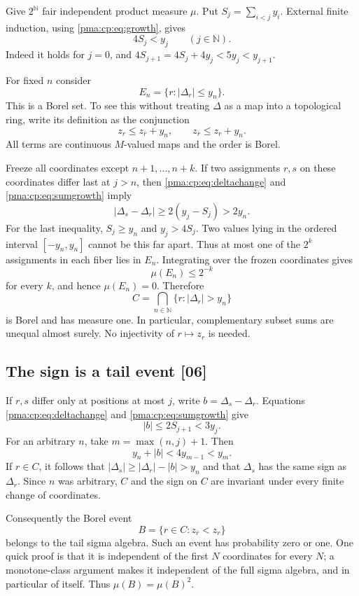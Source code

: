\documentclass[11pt]{article}
\numberwithin{equation}{section}
\theoremstyle{definition}
\theoremstyle{remark}
\newcommand{\N}{\mathbb N}
\newcommand{\src}[1]{\textup{\textsf{\small[#1]}}}
\newcommand{\Cantor}{2^{\N}}
\begin{document}
Give $\Cantor$ fair independent product measure $\mu$. Put
$S_j=\sum_{i<j}y_i$. External finite induction, using
\eqref{pma:cp:eq:growth}, gives
\begin{equation}
 4S_j<y_j\qquad(j\in\N).
 \label{pma:cp:eq:sumgrowth}
\end{equation}
Indeed it holds for $j=0$, and
$4S_{j+1}=4S_j+4y_j<5y_j<y_{j+1}$.

For fixed $n$ consider
\[
 E_n=\{r:|\Delta_r|\leq y_n\}.
\]
This is a Borel set. To see this without treating $\Delta$ as a map
into a topological ring, write its definition as the conjunction
\[
 z_r\leq z_{\bar r}+y_n,
 \qquad z_{\bar r}\leq z_r+y_n.
\]
All terms are continuous $M$-valued maps and the order is Borel.

Freeze all coordinates except $n+1,\ldots,n+k$. If two assignments
$r,s$ on these coordinates differ last at $j>n$, then
\eqref{pma:cp:eq:deltachange} and \eqref{pma:cp:eq:sumgrowth} imply
\[
 |\Delta_s-\Delta_r|
 \geq2(y_j-S_j)>2y_n.
\]
For the last inequality, $S_j\geq y_n$ and $y_j>4S_j$.
Two values lying in the ordered interval $[-y_n,y_n]$ cannot be
this far apart. Thus at most one of the $2^k$ assignments in each
fiber lies in $E_n$. Integrating over the frozen coordinates gives
\[
 \mu(E_n)\leq2^{-k}
\]
for every $k$, and hence $\mu(E_n)=0$. Therefore
\begin{equation}
 C=\bigcap_{n\in\N}\{r:|\Delta_r|>y_n\}
 \label{pma:cp:eq:conull}
\end{equation}
is Borel and has measure one. In particular, complementary subset
sums are unequal almost surely. No injectivity of $r\mapsto z_r$
is needed.

\subsection{The sign is a tail event \src{06}}

If $r,s$ differ only at positions at most $j$, write
$b=\Delta_s-\Delta_r$. Equations \eqref{pma:cp:eq:deltachange} and
\eqref{pma:cp:eq:sumgrowth} give
\[
 |b|\leq2S_{j+1}<3y_j.
\]
For an arbitrary $n$, take $m=\max(n,j)+1$. Then
\[
 y_n+|b|<4y_{m-1}<y_m.
\]
If $r\in C$, it follows that
$|\Delta_s|\geq|\Delta_r|-|b|>y_n$ and that $\Delta_s$ has the same
sign as $\Delta_r$. Since $n$ was arbitrary, $C$ and the sign on $C$
are invariant under every finite change of coordinates.

Consequently the Borel event
\[
 B=\{r\in C:z_{\bar r}<z_r\}
\]
belongs to the tail sigma algebra. Such an event has probability
zero or one. One quick proof is that it is independent of the first
$N$ coordinates for every $N$; a monotone-class argument makes it
independent of the full sigma algebra, and in particular of itself.
Thus $\mu(B)=\mu(B)^2$.
\end{document}
